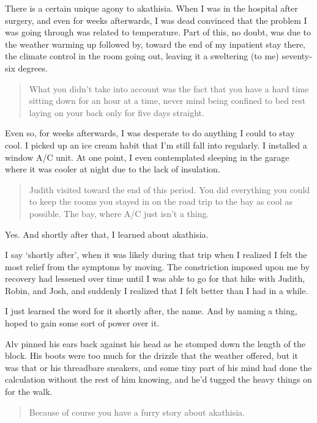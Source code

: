 There is a certain unique agony to akathisia. When I was in the hospital after surgery, and even for weeks afterwards, I was dead convinced that the problem I was going through was related to temperature. Part of this, no doubt, was due to the weather warming up followed by, toward the end of my inpatient stay there, the climate control in the room going out, leaving it a sweltering (to me) seventy-six degrees.

\begin{quote}
What you didn't take into account was the fact that you have a hard time sitting down for an hour at a time, never mind being confined to bed rest laying on your back only for five days straight.
\end{quote}

Even so, for weeks afterwards, I was desperate to do anything I could to stay cool. I picked up an ice cream habit that I'm still fall into regularly. I installed a window A/C unit. At one point, I even contemplated sleeping in the garage where it was cooler at night due to the lack of insulation.

\begin{quote}
Judith visited toward the end of this period. You did everything you could to keep the rooms you stayed in on the road trip to the bay as cool as possible. The bay, where A/C just isn't a thing.
\end{quote}

Yes. And shortly after that, I learned about akathisia.

I say `shortly after', when it was likely during that trip when I realized I felt the most relief from the symptoms by moving. The constriction imposed upon me by recovery had lessened over time until I was able to go for that hike with Judith, Robin, and Josh, and suddenly I realized that I felt better than I had in a while.

I just learned the word for it shortly after, the name. And by naming a thing, hoped to gain some sort of power over it.

Alv pinned his ears back against his head as he stomped down the length of the block. His boots were too much for the drizzle that the weather offered, but it was that or his threadbare sneakers, and some tiny part of his mind had done the calculation without the rest of him knowing, and he'd tugged the heavy things on for the walk.

\begin{quote}
Because of course you have a furry story about akathisia.
\end{quote}

